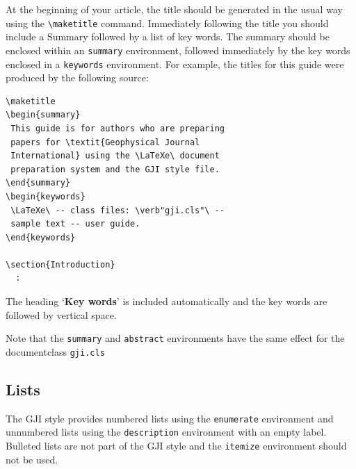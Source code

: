 \documentclass{gji}
\begin{document}
At the beginning of your article, the title should be generated in the
usual way using the \verb"\maketitle" command. Immediately following
the title you should include a Summary followed by a list of key
words. The summary should be enclosed within an \verb"summary"
environment, followed immediately by the key words enclosed in a
\verb"keywords" environment. For example, the titles for this guide
were produced by the following source:
\begin{verbatim}
\maketitle
\begin{summary}
 This guide is for authors who are preparing
 papers for \textit{Geophysical Journal
 International} using the \LaTeXe\ document
 preparation system and the GJI style file.
\end{summary}
\begin{keywords}
 \LaTeXe\ -- class files: \verb"gji.cls"\ --
 sample text -- user guide.
\end{keywords}

\section{Introduction}
  :
\end{verbatim}
The heading `\textbf{Key words}' is included automatically and the key
words are followed by vertical space.

Note that the \verb"summary" and \verb"abstract" environments have the same
effect for the documentclass \verb"gji.cls"

\subsection{Lists}

The GJI style provides numbered lists using the \verb"enumerate"
environment and unnumbered lists using the \verb"description"
environment with an empty label. Bulleted lists are not part of the GJI
style and the \verb"itemize" environment should not be used.
\end{document}
